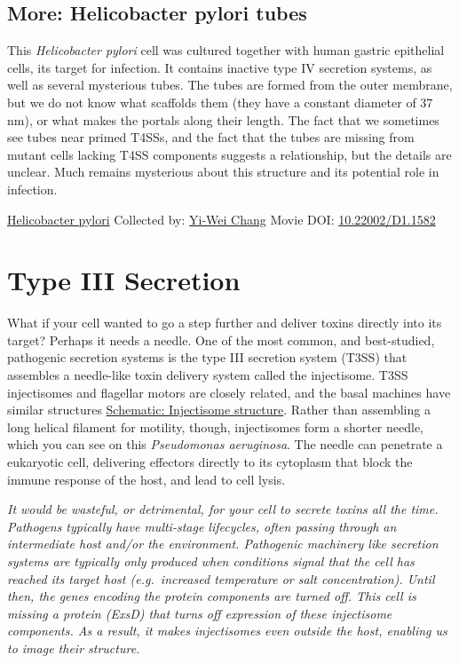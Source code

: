 \documentclass[]{tufte-book}
\begin{document}
\hypertarget{Helicobacter_pylori_tubes}{%
\subsection*{More: Helicobacter pylori tubes}\label{Helicobacter_pylori_tubes}}

This \emph{Helicobacter pylori} cell was cultured together with human gastric epithelial cells, its target for infection. It contains inactive type IV secretion systems, as well as several mysterious tubes. The tubes are formed from the outer membrane, but we do not know what scaffolds them (they have a constant diameter of 37 nm), or what makes the portals along their length. The fact that we sometimes see tubes near primed T4SSs, and the fact that the tubes are missing from mutant cells lacking T4SS components suggests a relationship, but the details are unclear. Much remains mysterious about this structure and its potential role in infection.



\hypertarget{htmlwidget-d4fe991a90247b674410}{}

\label{fig:9-3a}\protect\hyperlink{tree}{Helicobacter pylori} Collected by: \protect\hyperlink{yi-wei_chang}{Yi-Wei Chang} Movie DOI: \href{https://doi.org/10.22002/D1.1582}{10.22002/D1.1582}

\hypertarget{type-iii-secretion}{%
\section{Type III Secretion}\label{type-iii-secretion}}

What if your cell wanted to go a step further and deliver toxins directly into its target? Perhaps it needs a needle. One of the most common, and best-studied, pathogenic secretion systems is the type III secretion system (T3SS) that assembles a needle-like toxin delivery system called the injectisome. T3SS injectisomes and flagellar motors are closely related, and the basal machines have similar structures \protect\hyperlink{Injectisome_structure}{Schematic: Injectisome structure}. Rather than assembling a long helical filament for motility, though, injectisomes form a shorter needle, which you can see on this \emph{Pseudomonas aeruginosa}. The needle can penetrate a eukaryotic cell, delivering effectors directly to its cytoplasm that block the immune response of the host, and lead to cell lysis.

\emph{It would be wasteful, or detrimental, for your cell to secrete toxins all the time. Pathogens typically have multi-stage lifecycles, often passing through an intermediate host and/or the environment. Pathogenic machinery like secretion systems are typically only produced when conditions signal that the cell has reached its target host (e.g.~increased temperature or salt concentration). Until then, the genes encoding the protein components are turned off. This cell is missing a protein (ExsD) that turns off expression of these injectisome components. As a result, it makes injectisomes even outside the host, enabling us to image their structure.}
\end{document}
